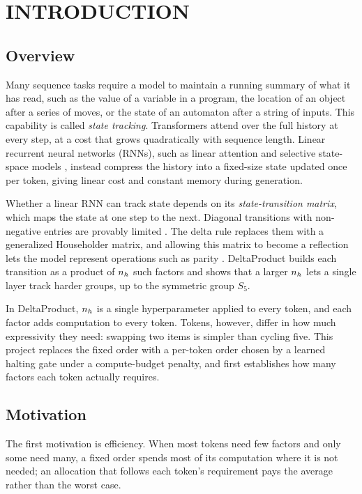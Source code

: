 \chapter{INTRODUCTION}
\label{chap:intro}
\section{Overview}
Many sequence tasks require a model to maintain a running summary of what it has read, such as the value of a variable in a program, the location of an object after a series of moves, or the state of an automaton after a string of inputs. This capability is called \emph{state tracking}. Transformers attend over the full history at every step, at a cost that grows quadratically with sequence length. Linear recurrent neural networks (RNNs), such as linear attention \cite{lineartransformers} and selective state-space models \cite{mamba}, instead compress the history into a fixed-size state updated once per token, giving linear cost and constant memory during generation.

Whether a linear RNN can track state depends on its \emph{state-transition matrix}, which maps the state at one step to the next. Diagonal transitions with non-negative entries are provably limited \cite{illusionofstate, sarrof, diagonalssm}. The delta rule \cite{fastweight, deltanet} replaces them with a generalized Householder matrix, and allowing this matrix to become a reflection lets the model represent operations such as parity \cite{negeig}. DeltaProduct \cite{deltaproduct} builds each transition as a product of $n_h$ such factors and shows that a larger $n_h$ lets a single layer track harder groups, up to the symmetric group $S_5$.

In DeltaProduct, $n_h$ is a single hyperparameter applied to every token, and each factor adds computation to every token. Tokens, however, differ in how much expressivity they need: swapping two items is simpler than cycling five. This project replaces the fixed order with a per-token order chosen by a learned halting gate under a compute-budget penalty, and first establishes how many factors each token actually requires.

\section{Motivation}
The first motivation is efficiency. When most tokens need few factors and only some need many, a fixed order spends most of its computation where it is not needed; an allocation that follows each token's requirement pays the average rather than the worst case.

